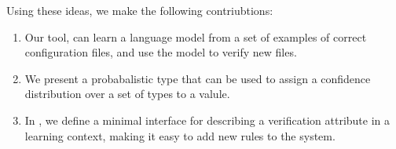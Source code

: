 Using these ideas, we make the following contriubtions:

\begin{enumerate}

  \item Our tool, \app can learn a language model from a set of examples of correct configuration files, and use the model to verify new files.
  \item We present a probabalistic type that can be used to assign a confidence distribution over a set of types to a valule.
  \item In \app, we define a minimal interface for describing a verification attribute in a learning context, making it easy to add new rules to the system.

\end{enumerate}
